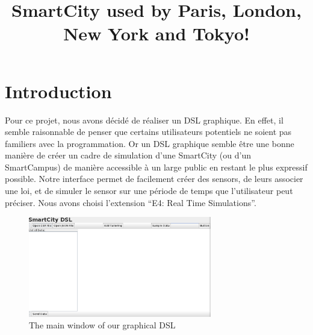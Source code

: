 \documentclass{article}
\title{SmartCity used by Paris, London, New York and Tokyo!}
\begin{document}
\maketitle
\section{Introduction}

Pour ce projet, nous avons décidé de réaliser un DSL graphique. En effet, il semble raisonnable de penser que certains utilisateurs potentiels ne soient pas familiers avec la programmation. Or un DSL graphique semble être une bonne manière de créer un cadre de simulation d'une SmartCity (ou d'un SmartCampus) de manière accessible à un large public en restant le plus expressif possible. Notre interface permet de facilement créer des sensors, de leurs associer une loi, et de simuler le sensor sur une période de temps que l'utilisateur peut préciser. Nous avons choisi l'extension ``E4: Real Time Simulations''.

\begin{figure}
  \centering
  \includegraphics[width=8cm]{Figs/intro.png}
  \caption{The main window of our graphical DSL}
  \label{fig:intro}
\end{figure}
\end{document}
